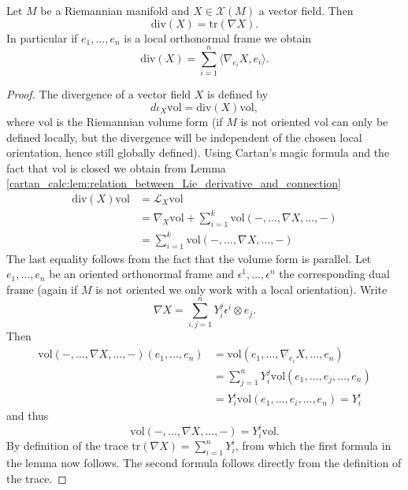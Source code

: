 \begin{lemma}
    Let $M$ be a Riemannian manifold and $X \in \mathscr{X}(M)$ a vector field. Then 
    \[
    \mathrm{div}(X) = \mathrm{tr}(\nabla X).
    \]
    In particular if $e_1,\ldots,e_n$ is a local orthonormal frame we obtain 
    \[
    \mathrm{div}(X) = \sum_{i=1}^{n} \langle \nabla_{e_i}X, e_i \rangle.
    \]
\end{lemma}

\begin{proof}
    The divergence of a vector field $X$ is defined by 
    \[
    d\iota_X \mathrm{vol} = \mathrm{div}(X) \mathrm{vol},
    \]
    where $\mathrm{vol}$ is the Riemannian volume form (if $M$ is not oriented $\mathrm{vol}$ can only be defined locally, but the divergence will be independent of the chosen local orientation, hence still globally defined). Using Cartan's magic formula and the fact that $\mathrm{vol}$ is closed we obtain from Lemma \ref{cartan_calc:lem:relation_between_Lie_derivative_and_connection}
    \begin{align*}
        \mathrm{div}(X) \mathrm{vol} & = \mathcal{L}_X \mathrm{vol} \\
    & = \nabla_X \mathrm{vol} + \sum_{i=1}^{k} \mathrm{vol}(-,\ldots,\nabla X,\ldots,-) \\
    & = \sum_{i=1}^{k} \mathrm{vol}(-,\ldots,\nabla X,\ldots,-)
    \end{align*}
    The last equality follows from the fact that the volume form is parallel. Let $e_1,\ldots,e_n$ be an oriented orthonormal frame and $\epsilon^1,\ldots,\epsilon^n$ the corresponding dual frame (again if $M$ is not oriented we only work with a local orientation). Write  
    \[
    \nabla X = \sum_{i,j=1}^{n} Y_i^j \epsilon^i \otimes e_j.
    \]
    Then 
    \begin{align*}
        \mathrm{vol}(-,\ldots,\nabla X,\ldots,-)(e_1,\ldots,e_n) & = \mathrm{vol}(e_1,\ldots,\nabla_{e_i}X,\ldots,e_n)  \\
        & = \sum_{j=1}^{n} Y_i^j \mathrm{vol}(e_1,\ldots,e_j,\ldots,e_n)  \\
        &= Y_i^i \mathrm{vol}(e_1,\ldots,e_i,\ldots,e_n) = Y_i^i
    \end{align*}
    and thus 
    \[
    \mathrm{vol}(-,\ldots,\nabla X,\ldots,-) = Y_i^i \mathrm{vol}.
    \]
    By definition of the trace $\mathrm{tr}(\nabla X) = \sum_{i=1}^{n} Y_i^i$, from which the first formula in the lemma now follows. The second formula follows directly from the definition of the trace.
\end{proof}

